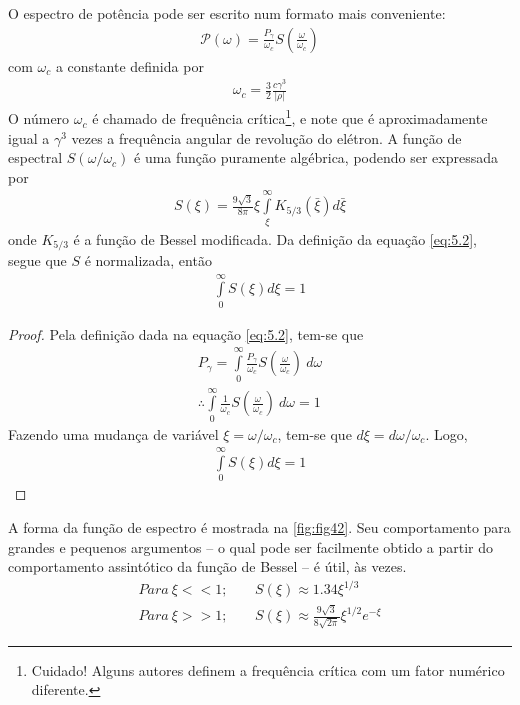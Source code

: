 O espectro de potência pode ser escrito num formato mais conveniente:
\begin{align}
	\mathscr{P}(\omega) = \frac{P_\gamma}{\omega_c} S\left(\frac{\omega}{\omega_c}\right)\label{eq:5.2}
\end{align}
com $\omega_c$ a constante definida por
\begin{align}
	\omega_c = \frac{3}{2}\frac{c\gamma^3}{|\rho|}
\end{align}
O número $\omega_c$ é chamado de frequência crítica\footnote{Cuidado! Alguns autores definem a frequência crítica com um fator numérico diferente.}, e note que é aproximadamente igual a $\gamma^3$ vezes a frequência angular de revolução do elétron. A função de espectral $S(\omega/\omega_c)$ é uma função puramente algébrica, podendo ser expressada por
\begin{align}
	S(\xi) = \frac{9\sqrt{3}}{8\pi}\xi\int\limits_{\xi}^{\infty}K_{5/3}(\bar{\xi})d\bar{\xi}
\end{align}
onde $K_{5/3}$ é a função de Bessel modificada. Da definição da equação \eqref{eq:5.2}, segue que $S$ é normalizada, então
\begin{align}
	\int\limits_{0}^{\infty}S(\xi)d\xi = 1
\end{align}

\begin{proof}
	Pela definição dada na equação \eqref{eq:5.2}, tem-se que
	\begin{align*}
		P_\gamma = \int\limits_{0}^{\infty}\frac{P_\gamma}{\omega_c} S\left(\frac{\omega}{\omega_c}\right)\ d\omega\\
		\therefore \int\limits_{0}^{\infty}\frac{1}{\omega_c} S\left(\frac{\omega}{\omega_c}\right)\ d\omega = 1
	\end{align*}
	Fazendo uma mudança de variável $\xi = \omega/\omega_c $, tem-se que $d\xi = d\omega/\omega_c$. Logo,
	\begin{align*}
		\int\limits_{0}^{\infty}S(\xi)d\xi = 1
	\end{align*}
\end{proof}

A forma da função de espectro é mostrada na \autoref{fig:fig42}. Seu comportamento para grandes e pequenos argumentos -- o qual pode ser facilmente obtido a partir do comportamento assintótico da função de Bessel -- é útil, às vezes.
\begin{align}
	Para\ \xi<<1;&\ \ \ \ \ S(\xi)\approx 1.34 \xi^{1/3}\nonumber\\
	Para\ \xi>>1;&\ \ \ \ \ S(\xi)\approx \frac{9\sqrt{3}}{8\sqrt{2\pi}} \xi^{1/2}e^{-\xi}\label{eq:5.6}
\end{align}

